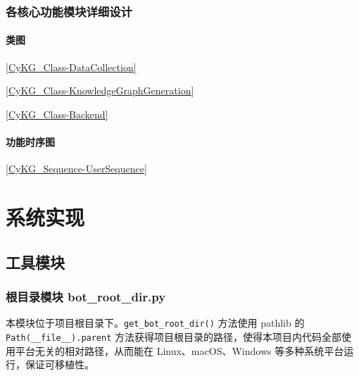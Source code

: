 \documentclass[a4paper,AutoFakeBold,oneside,12pt]{book}
\begin{document}
\subsection{各核心功能模块详细设计}

\subsubsection{类图}

\ref{CyKG_Class-DataCollection}


\ref{CyKG_Class-KnowledgeGraphGeneration}


\ref{CyKG_Class-Backend}


\subsubsection{功能时序图}

\ref{CyKG_Sequence-UserSequence}


\chapter{系统实现}

\section{工具模块}

\subsection{根目录模块 bot{\_}root{\_}dir.py}

本模块位于项目根目录下。\lstinline[style = python]|get_bot_root_dir()| 方法使用 pathlib 的 \lstinline[style = python]|Path(__file__).parent| 方法获得项目根目录的路径，使得本项目内代码全部使用平台无关的相对路径，从而能在 Linux、macOS、Windows 等多种系统平台运行，保证可移植性。
\end{document}
